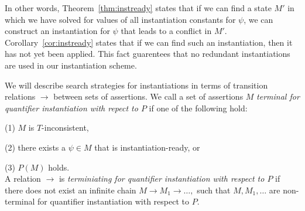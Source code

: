 \documentclass{llncs}
\begin{document}
In other words, Theorem~\ref{thm:instready} states that if we can find a state $M'$ in which we have solved for values of all instantiation constants for $\psi$, we can construct an instantiation for $\psi$ that leads to a conflict in $M'$.
Corollary~\ref{cor:instready} states that if we can find such an instantiation, then it has not yet been applied.
This fact guarentees that no redundant instantiations are used in our instantiation scheme.

\begin{comment}
Now, let us focus on identifying states in which there does not exist any useful instantiations with regards to assumptions about our counterexample.
The basic idea is to find a literal $\l \mapsto^I \psi$ in $M$ such that $\forall \bar{x}. \neg l[\bar{x}/\bar{e}]$ is satisifiable in $M$.
We call such a literal to be $\emph{compatible}$ in $M$.
For example, a EUF literal $f( t_1, \ldots, t_n ) = s$ is compatible if for all terms of the form $f( s_1, \ldots, s_n )$, we have that $t_1 \neq s_1, \ldots t_n \neq s_n$.
That is, the domain of $f( t_1, \ldots, t_n )$ is disjoint from all other terms with top symbol $f$.

Given a theory $T$, we will define search method that will drive the DPLL(T) search with splitting lemmas of the form $( l \vee \neg l )$.
The idea is to chose such lemmas such that the DPLL(T) search will either reach a state $M \parallel F$ such that $\psi$ is instantiation-ready in $M$, or there exists some literal $l \mapsto^I \psi$ that is compatible in $M$.
\end{comment}

We will describe search strategies for instantiations in terms of transition relations $\rightarrow$ between sets of assertions.
We call a set of assertions $M$ \emph{terminal for quantifier instantiation with repect to $P$} if one of the following hold:

(1) $M$ is $T$-inconsistent,

(2) there exists a $\psi \in M$ that is instantiation-ready, or

(3) $P(M)$ holds. \\

A relation $\rightarrow$ is \emph{terminiating for quantifier instantiation with respect to $P$} if there does not exist an infinite chain $M \rightarrow M_1 \rightarrow \ldots,$ such that $M, M_1, \ldots$ are non-terminal for quantifier instantiation with respect to $P$.
\end{document}
